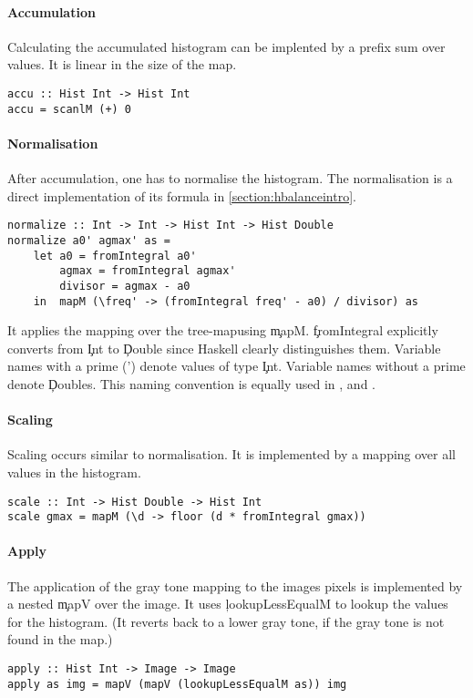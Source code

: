   \paragraph{Accumulation}
  Calculating the accumulated histogram can be implented by
  a prefix sum over values. It is linear in the size of the map.
  \begin{lstlisting}
accu :: Hist Int -> Hist Int
accu = scanlM (+) 0
  \end{lstlisting}
    
  \paragraph{Normalisation}
  After accumulation, one has to normalise the histogram.
  The normalisation is a direct implementation of its formula in
  \ref{section:hbalanceintro}.
  \begin{lstlisting}
normalize :: Int -> Int -> Hist Int -> Hist Double
normalize a0' agmax' as =
    let a0 = fromIntegral a0'
        agmax = fromIntegral agmax'
        divisor = agmax - a0
    in  mapM (\freq' -> (fromIntegral freq' - a0) / divisor) as
  \end{lstlisting}
  It applies the mapping over the tree-mapusing \c{mapM}.
  \c{fromIntegral} explicitly converts from \c{Int} to \c{Double} since
  Haskell clearly distinguishes them. Variable names with a prime
  (') denote values of type \c{Int}. Variable names without a prime
  denote \c{Double}s. This naming convention is equally used in
  \man, \ndpn and \ndpv.
    
  \paragraph{Scaling}
  Scaling occurs similar to normalisation. It is implemented
  by a mapping over all values in the histogram.
  \begin{lstlisting}
scale :: Int -> Hist Double -> Hist Int
scale gmax = mapM (\d -> floor (d * fromIntegral gmax))
  \end{lstlisting}
    
  \paragraph{Apply}
  The application of the gray tone mapping to the images pixels
  is implemented by a nested \c{mapV} over the image. It uses
  \c{lookupLessEqualM} to lookup the values for the histogram.
  (It reverts back to a lower gray tone, if the gray tone is not found in the map.)
  \begin{lstlisting}
apply :: Hist Int -> Image -> Image
apply as img = mapV (mapV (lookupLessEqualM as)) img
  \end{lstlisting}
  
